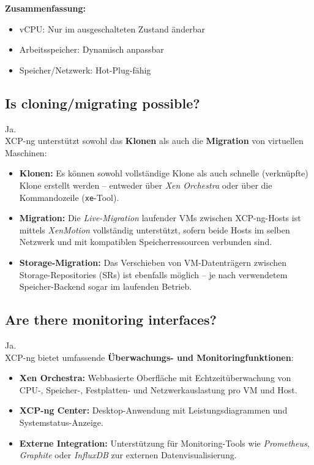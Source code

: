\documentclass[BMR,Seminar,ngerman,IEEE]{twbook}
\begin{document}
\noindent\textbf{Zusammenfassung:}
\begin{itemize}
    \item vCPU: Nur im ausgeschalteten Zustand änderbar
    \item Arbeitsspeicher: Dynamisch anpassbar
    \item Speicher/Netzwerk: Hot-Plug-fähig
\end{itemize}
\subsection{Is cloning/migrating possible?}
Ja. \\
XCP-ng unterstützt sowohl das \textbf{Klonen} als auch die \textbf{Migration} von virtuellen Maschinen:
\begin{itemize}
    \item \textbf{Klonen:} Es können sowohl vollständige Klone als auch schnelle (verknüpfte) Klone erstellt werden – entweder über \textit{Xen Orchestra} oder über die Kommandozeile (\texttt{xe}-Tool).
    \item \textbf{Migration:} Die \textit{Live-Migration} laufender VMs zwischen XCP-ng-Hosts ist mittels \textit{XenMotion} vollständig unterstützt, sofern beide Hosts im selben Netzwerk und mit kompatiblen Speicherressourcen verbunden sind.
    \item \textbf{Storage-Migration:} Das Verschieben von VM-Datenträgern zwischen Storage-Repositories (SRs) ist ebenfalls möglich – je nach verwendetem Speicher-Backend sogar im laufenden Betrieb.
\end{itemize}
\subsection{Are there monitoring interfaces?}
Ja. \\
XCP-ng bietet umfassende \textbf{Überwachungs- und Monitoringfunktionen}:
\begin{itemize}
    \item \textbf{Xen Orchestra:} Webbasierte Oberfläche mit Echtzeitüberwachung von CPU-, Speicher-, Festplatten- und Netzwerkauslastung pro VM und Host.
    \item \textbf{XCP-ng Center:} Desktop-Anwendung mit Leistungsdiagrammen und Systemstatus-Anzeige.
    \item \textbf{Externe Integration:} Unterstützung für Monitoring-Tools wie \textit{Prometheus}, \textit{Graphite} oder \textit{InfluxDB} zur externen Datenvisualisierung.
\end{itemize}
\end{document}
